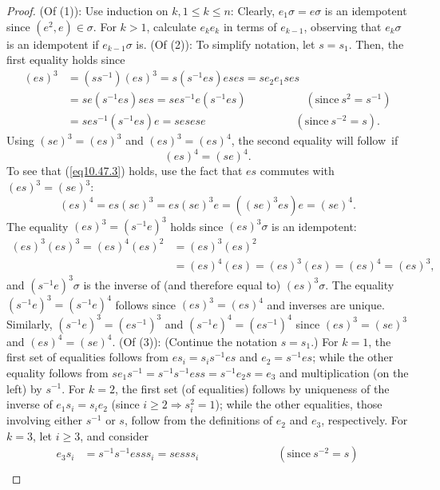 \documentclass{surv-l}
\numberwithin{equation}{section}
\numberwithin{table}{section}
\numberwithin{figure}{section}
\theoremstyle{definition}
\begin{document}
\begin{proof}
(Of (1)): Use induction on $k, 1\leq k\leq n$: Clearly,
$e_{1}\sigma=e\sigma$ is an idempotent since $(e^{2},
e)\in\sigma$. For $k>1$, calculate $e_{k}e_{k}$ in terms of
$e_{k-1}$, observing that $e_{k}\sigma$ is an idempotent if
$e_{k-1}\sigma$ is. (Of (2)): To simplify notation, let $s=s_{1}$.
Then, the first equality holds since
\begin{align*}
(es)^3 &=(ss^{-1})(es)^{3}=s(s^{-1}es)eses=se_{2}e_{1} ses \\
&=se(s^{-1}es)ses=ses^{-1}e (s^{-1} es)\qquad\quad\qquad\; (\mathrm{since}\ s^{2}=s^{-1})\\
&=ses^{-1}(s^{-1}es)e=sesese\qquad\qquad\qquad\qquad (\mathrm{since}\ s^{-2}=s).
\end{align*}
Using $(se)^3 =(es)^{3}$ and $(es)^3 =(es)^{4}$, the second
equality will follow~if
\begin{equation}\label{eq10.47.3}
(es)^{4}=(se)^{4}.
\end{equation}
To see that (\ref{eq10.47.3}) holds, use the fact that $es$
commutes with $(es)^3 =(se)^{3}$:
\[
(es)^4=es(se)^{3}=es(se)^{3}e=((se)^{3}es)e=(se)^{4}.
\]
The equality $(es)^3 =(s^{-1}e)^{3}$ holds since
$(es)^{3}\sigma$ is an idempotent:
\begin{align*}
(es)^3 (es)^3 =(es)^{4} (es)^2 &=(es)^{3} (es)^2 \\
&=(es)^{4}(es)=(es)^{3}(es)=(es)^{4}=(es)^{3},
\end{align*}
and $(s^{-1}e)^{3}\sigma$ is the inverse of (and therefore
equal to) $(es)^{3}\sigma$. The equality
$(s^{-1}e)^{3}=(s^{-1}e)^{4}$ follows since $(es)^3 =(es)^{4}$
and inverses are unique. Similarly,
$(s^{-1}e)^{3}=(es^{-1})^{3}$ and
$(s^{-1}e)^{4}=(es^{-1})^{4}$ since $(es)^3 = (se)^3$ and
$(es)^{4}= (se)^4$. (Of (3)): (Continue the notation
$s=s_{1}.$) For $k=1$, the first set of equalities follows
from $es_{i}=s_{i}s^{-1} es$ and $e_{2}=s^{-1} es$; while the
other equality follows from
$se_{1}s^{-1}=s^{-1}s^{-1}ess=s^{-1}e_{2}s= e_3$ and
multiplication (on the left) by $s^{-1}$. For $k=2$, the first
set (of equalities) follows by uniqueness of the inverse of
$e_{1}s_{i}=s_{i}e_{2}$ (since $i\geq 2\Rightarrow
s_{i}^{2}=1$); while the other equalities, those involving
either $s^{-1}$ or $s$, follow from the definitions of $e_{2}$
and $e_{3}$, respectively. For $k=3$, let $i\geq 3$, and
consider
\begin{align*}
e_{3}s_{i}&=s^{-1}s^{-1}esss_{i}=sesss_{i}\qquad\qquad\qquad\quad (\mathrm{since}\ s^{-2}=s) \\

\end{align*}
\end{proof}
\end{document}
